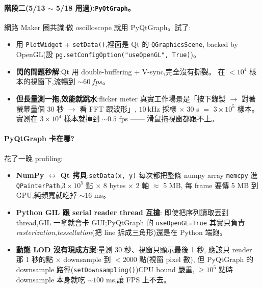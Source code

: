 \paragraph{階段二(5/13 \(\sim\) 5/18 用過):\texttt{PyQtGraph}。}
網路 Maker 圈共識:做 oscilloscope 就用 PyQtGraph。試了:

\begin{itemize}[leftmargin=2em,itemsep=0pt]
  \item 用 \texttt{PlotWidget} + \texttt{setData()},裡面是 Qt 的 \texttt{QGraphicsScene},
        backed by OpenGL(設 \texttt{pg.setConfigOption("useOpenGL", True)})。
  \item \textbf{閃的問題秒解}:Qt 用 double-buffering + V-sync,完全沒有撕裂。
        在 \(< 10^4\) 樣本的視窗下,流暢到 \(\sim \SI{60}{fps}\)。
  \item \textbf{但長量測一拖,效能就跳水}:flicker meter 真實工作場景是「按下錄製
        \(\to\) 對著螢幕量個 30 秒 \(\to\) 看 FFT 跟波形」,
        \(\SI{10}{\kilo\hertz}\) 採樣 \(\times\) 30 s \(=\) \(3 \times 10^5\) 樣本。
        實測在 \(3 \times 10^4\) 樣本就掉到 \(\sim 0.5\) fps —— 滑鼠拖視窗都跟不上。
\end{itemize}

\paragraph{PyQtGraph 卡在哪?} 花了一晚 profiling:

\begin{itemize}[leftmargin=2em,itemsep=0pt]
  \item \textbf{NumPy \(\leftrightarrow\) Qt 拷貝}:\texttt{setData(x, y)} 每次都把整條 numpy array
        \texttt{memcpy} 進 \texttt{QPainterPath},\(3 \times 10^5\) 點 \(\times\) 8 bytes \(\times\) 2 軸 \(\approx\) 5 MB,
        每 frame 要傳 5 MB 到 GPU,純頻寬就吃掉 \(\sim 16\) ms。
  \item \textbf{Python GIL 跟 serial reader thread 互搶}:
        即使把序列讀取丟到 thread,GIL 一拿就會卡 GUI;PyQtGraph 的 \texttt{useOpenGL=True}
        其實只負責 \emph{rasterization},\emph{tessellation}(把 line 拆成三角形)還是在 Python 端跑。
  \item \textbf{動態 LOD 沒有現成方案}:量測 30 秒、視窗只顯示最後 1 秒,
        應該只 render 那 1 秒的點 \(\times\) downsample 到 \(< 2000\) 點(視窗 pixel 數),
        但 PyQtGraph 的 downsample 路徑(\texttt{setDownsampling()})CPU bound 嚴重,
        \(\geq 10^5\) 點時 downsample 本身就吃 \(\sim 100\) ms,讓 FPS 上不去。
\end{itemize}

